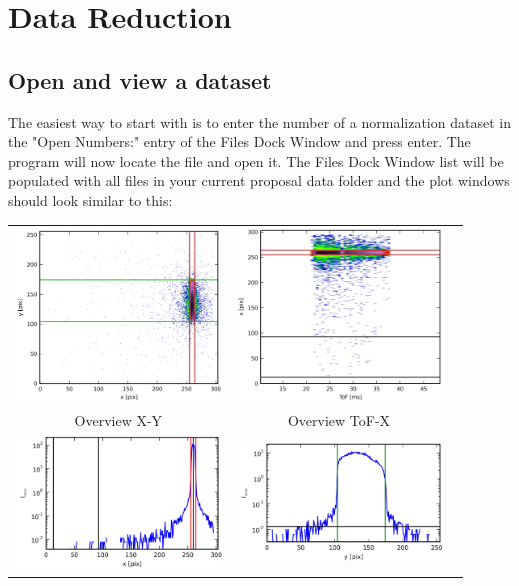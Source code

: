 \chapter{Data Reduction}
\label{chap:data_reduction}

\section{Open and view a dataset}
\label{sec:open_file}
  The easiest way to start with is to enter the number of a normalization dataset in the "Open Numbers:" entry of the Files Dock Window and press enter. The program will now locate the file and open it.
  The Files Dock Window list will be populated with all files in your current proposal data folder and the plot windows should look similar to this:
  
  \begin{tabular}{ccc}
  \includegraphics[width=155pt]{screenshots/normalizemap1.png} &
  \includegraphics[width=155pt]{screenshots/normalizemap2.png} &\\
  Overview X-Y & Overview ToF-X & \\
  \includegraphics[width=155pt]{screenshots/normalize1.png} &
  \includegraphics[width=155pt]{screenshots/normalize2.png} &

\end{tabular}
